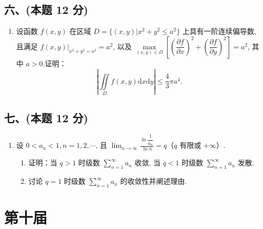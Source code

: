 \subsection*{六、(本题 12 分)}
\begin{enumerate}[start=10]
    \item 设函数 $f(x, y)$ 在区域 $D = \{(x, y) | x^2 + y^2 \leqslant a^2\}$ 上具有一阶连续偏导数, 且满足 $f(x, y)|_{x^2 + y^2 = a^2} = a^2$, 以及 $\max\limits_{(x, y) \in D} \left[ \left( \dfrac{\partial f}{\partial x} \right)^2 + \left( \dfrac{\partial f}{\partial y} \right)^2 \right] = a^2$, 其中 $a > 0$.证明：
          \[
              \left| \iint\limits_{D} f(x, y) \mathrm{d}x \mathrm{d}y \right| \leqslant \frac{4}{3} \pi a^4.
          \]
\end{enumerate}

\subsection*{七、(本题 12 分)}
\begin{enumerate}[start=11]
    \item 设 $0 < a_n < 1, n = 1, 2, \cdots$, 且 $\displaystyle\lim_{n \to \infty} \frac{\ln \dfrac{1}{a_n}}{\ln n} = q$（$q$ 有限或 $+\infty$）.
          \begin{enumerate}
              \item[(1)] 证明：当 $q > 1$ 时级数 $\displaystyle\sum_{n=1}^{\infty} a_n$ 收敛, 当 $q < 1$ 时级数 $\displaystyle\sum_{n=1}^{\infty} a_n$ 发散.
              \item[(2)] 讨论 $q = 1$ 时级数 $\displaystyle\sum_{n=1}^{\infty} a_n$ 的收敛性并阐述理由.
          \end{enumerate}
\end{enumerate}


\newpage
\section{第十届}

